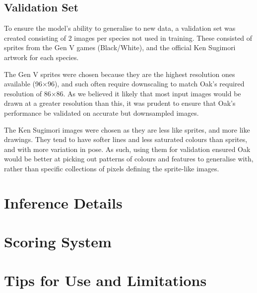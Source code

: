\documentclass[onecolumn]{article}
\begin{document}
\subsection*{Validation Set}

To ensure the model's ability to generalise to new data, a validation set was created consisting of 2 images per species not used in training. These consisted of sprites from the Gen V games (Black/White), and the official Ken Sugimori artwork for each species.

The Gen V sprites were chosen because they are the highest resolution ones available (96$\times$96), and such often require downscaling to match Oak's required resolution of 86$\times$86. As we believed it likely that most input images would be drawn at a greater resolution than this, it was prudent to ensure that Oak's performance be validated on accurate but downsampled images.

The Ken Sugimori images were chosen as they are less like sprites, and more like drawings. They tend to have softer lines and less saturated colours than sprites, and with more variation in pose. As such, using them for validation ensured Oak would be better at picking out patterns of colours and features to generalise with, rather than specific collections of pixels defining the sprite-like images.


\section*{Inference Details}

\section*{Scoring System}

\section*{Tips for Use and Limitations}




\end{document}
